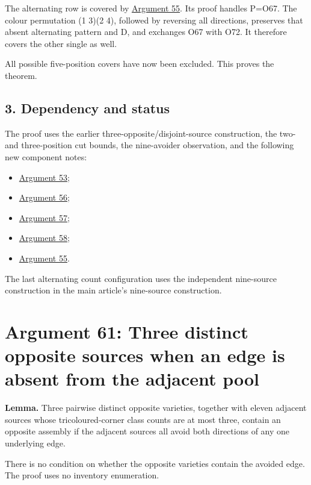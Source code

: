 \documentclass[
  10pt,
]{article}
\providecommand{\tightlist}{%
  \setlength{\itemsep}{0pt}\setlength{\parskip}{0pt}}
\begin{document}
The alternating row is covered by \protect\hyperlink{arg-55}{Argument
55}. Its proof handles P=O67. The colour permutation (1 3)(2 4),
followed by reversing all directions, preserves that absent alternating
pattern and D, and exchanges O67 with O72. It therefore covers the other
single as well.

All possible five-position covers have now been excluded. This proves
the theorem.

\hypertarget{dependency-and-status}{%
\subsection*{3. Dependency and status}\label{dependency-and-status}}

The proof uses the earlier three-opposite/disjoint-source construction,
the two- and three-position cut bounds, the nine-avoider observation,
and the following new component notes:

\begin{itemize}
\tightlist
\item
  \protect\hyperlink{arg-53}{Argument 53};
\item
  \protect\hyperlink{arg-56}{Argument 56};
\item
  \protect\hyperlink{arg-57}{Argument 57};
\item
  \protect\hyperlink{arg-58}{Argument 58};
\item
  \protect\hyperlink{arg-55}{Argument 55}.
\end{itemize}

The last alternating count configuration uses the independent
nine-source construction in the main article's nine-source construction.

\hypertarget{arg-61}{%
\section{Argument 61: Three distinct opposite sources when an edge is
absent from the adjacent pool}\label{arg-61}}

\textbf{Lemma.} Three pairwise distinct opposite varieties, together
with eleven adjacent sources whose tricoloured-corner class counts are
at most three, contain an opposite assembly if the adjacent sources all
avoid both directions of any one underlying edge.

There is no condition on whether the opposite varieties contain the
avoided edge. The proof uses no inventory enumeration.
\end{document}
